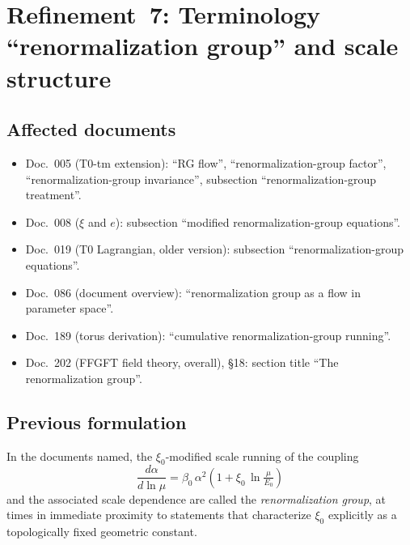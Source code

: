 \section{\texorpdfstring{Refinement~7: Terminology \enquote{renormalization group} and scale structure}{Refinement 7: Terminology renormalization group and scale structure}}

\subsection*{Affected documents}

\begin{itemize}
  \item Doc.~005 (T0-tm extension): \enquote{RG flow}, \enquote{renormalization-group factor},
        \enquote{renormalization-group invariance},
        subsection \enquote{renormalization-group treatment}.
  \item Doc.~008 ($\xi$ and $e$): subsection \enquote{modified
        renormalization-group equations}.
  \item Doc.~019 (T0 Lagrangian, older version):
        subsection \enquote{renormalization-group equations}.
  \item Doc.~086 (document overview): \enquote{renormalization group as a flow
        in parameter space}.
  \item Doc.~189 (torus derivation): \enquote{cumulative
        renormalization-group running}.
  \item Doc.~202 (FFGFT field theory, overall), \S 18:
        section title \enquote{The renormalization group}.
\end{itemize}

\subsection*{Previous formulation}

In the documents named, the $\xi_0$-modified scale running of the coupling
\begin{equation}
  \frac{d\alpha}{d\ln\mu}
  = \beta_0\,\alpha^2\!\left(1 + \xi_0\,\ln\tfrac{\mu}{E_0}\right)
  \tag{old -- imprecise}
\end{equation}
and the associated scale dependence are called the \emph{renormalization
group}, at times in immediate proximity to statements that characterize
$\xi_0$ explicitly as a topologically fixed geometric constant.

